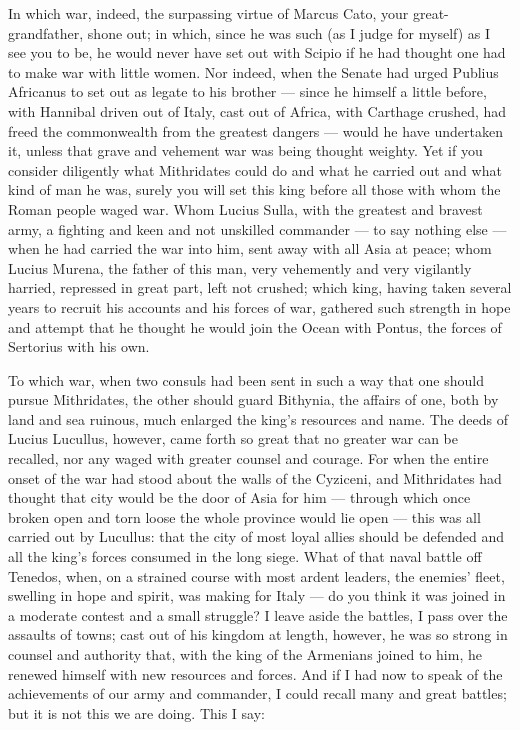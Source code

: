  In which war, indeed, the surpassing virtue of Marcus Cato, your great-grandfather, shone out; in which, since he was such (as I judge for myself) as I see you to be, he would never have set out with Scipio if he had thought one had to make war with little women. Nor indeed, when the Senate had urged Publius Africanus to set out as legate to his brother --- since he himself a little before, with Hannibal driven out of Italy, cast out of Africa, with Carthage crushed, had freed the commonwealth from the greatest dangers --- would he have undertaken it, unless that grave and vehement war was being thought weighty. Yet if you consider diligently what Mithridates could do and what he carried out and what kind of man he was, surely you will set this king before all those with whom the Roman people waged war. Whom Lucius Sulla, with the greatest and bravest army, a fighting and keen and not unskilled commander --- to say nothing else --- when he had carried the war into him, sent away with all Asia at peace; whom Lucius Murena, the father of this man, very vehemently and very vigilantly harried, repressed in great part, left not crushed; which king, having taken several years to recruit his accounts and his forces of war, gathered such strength in hope and attempt that he thought he would join the Ocean with Pontus, the forces of Sertorius with his own.

 To which war, when two consuls had been sent in such a way that one should pursue Mithridates, the other should guard Bithynia, the affairs of one, both by land and sea ruinous, much enlarged the king's resources and name. The deeds of Lucius Lucullus, however, came forth so great that no greater war can be recalled, nor any waged with greater counsel and courage. For when the entire onset of the war had stood about the walls of the Cyziceni, and Mithridates had thought that city would be the door of Asia for him --- through which once broken open and torn loose the whole province would lie open --- this was all carried out by Lucullus: that the city of most loyal allies should be defended and all the king's forces consumed in the long siege. What of that naval battle off Tenedos, when, on a strained course with most ardent leaders, the enemies' fleet, swelling in hope and spirit, was making for Italy --- do you think it was joined in a moderate contest and a small struggle? I leave aside the battles, I pass over the assaults of towns; cast out of his kingdom at length, however, he was so strong in counsel and authority that, with the king of the Armenians joined to him, he renewed himself with new resources and forces. And if I had now to speak of the achievements of our army and commander, I could recall many and great battles; but it is not this we are doing. This I say:

